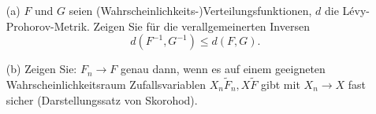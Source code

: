 \begin{exercise}
\begin{itemize}
    \item[(a)] $F$ und $G$ seien (Wahrscheinlichkeits-)Verteilungsfunktionen, $d$
    die Lévy-Prohorov-Metrik. Zeigen Sie für die verallgemeinerten Inversen
    \begin{equation*}
      d(F^{-1},G^{-1}) \leq d(F,G).
    \end{equation*}
    \item[(b)] Zeigen Sie: $F_n \longrightarrow F$ genau dann, wenn es auf einem
    geeigneten Wahrscheinlichkeitsraum Zufallsvariablen $X_n \tilde F_n, X \tilde F$ gibt
    mit $X_n \rightarrow X$ fast sicher (Darstellungssatz von Skorohod).
\end{itemize}
\end{exercise}
\begin{solution}
\end{solution}
